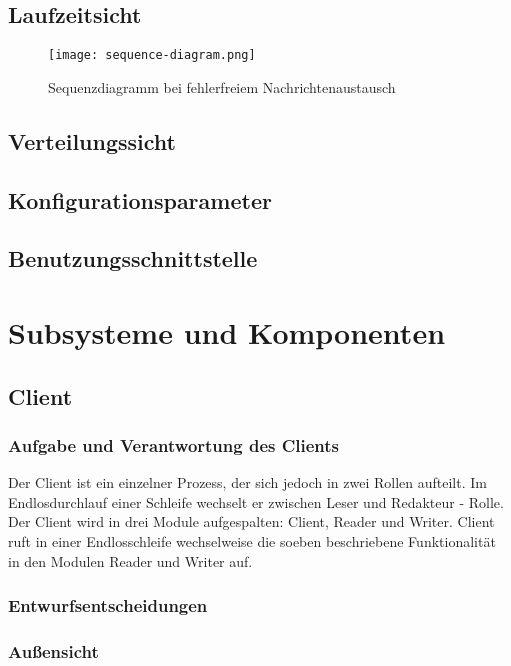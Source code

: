 \documentclass{article}
\begin{document}
\subsection{Laufzeitsicht}
\begin{figure}[H]
\centering
\texttt{[image: sequence-diagram.png]}
\caption[seq-dia]{Sequenzdiagramm bei fehlerfreiem Nachrichtenaustausch}
\label{fig:sequence-diagram}
\end{figure}

\subsection{Verteilungssicht}


\subsection{Konfigurationsparameter}


\subsection{Benutzungsschnittstelle}

\newpage
\section{Subsysteme und Komponenten}
\subsection{Client}
\subsubsection{Aufgabe und Verantwortung des Clients}
Der Client ist ein einzelner Prozess, der sich jedoch in zwei Rollen aufteilt. Im Endlosdurchlauf einer Schleife wechselt er zwischen Leser und Redakteur - Rolle.\\

Der Client wird in drei Module aufgespalten: Client, Reader und Writer. Client ruft in einer Endlosschleife wechselweise die soeben beschriebene Funktionalität in den Modulen Reader und Writer auf.

\subsubsection{Entwurfsentscheidungen}
\subsubsection{Außensicht}
\end{document}
